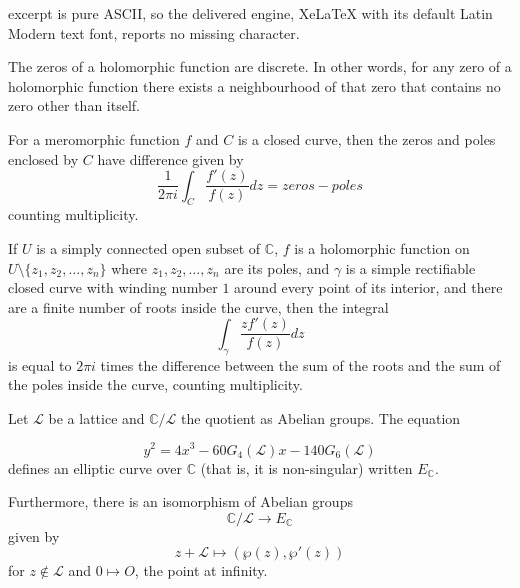 \documentclass[10pt,a4paper]{amsart}
\newcommand{\C}{\mathbb{C}}
\begin{document}
excerpt is pure ASCII, so the delivered engine, XeLaTeX with its default Latin Modern text font, reports no missing character.
\begin{thm}\label{discretezero}
    The zeros of a holomorphic function are discrete. In other words, for any zero of a holomorphic function there exists a neighbourhood of that zero that contains no zero other than itself.
\end{thm}

\begin{thm}\label{argprinciple}For a meromorphic function $f$ and $C$ is a closed curve, then the zeros and poles enclosed by $C$ have difference given by
$$\frac{1}{2\pi i}\int_C\frac{f'(z)}{f(z)}dz= zeros-poles$$
counting multiplicity.
\end{thm}

\begin{theorem} \label{extended-argument-principle}
    If $U$ is a simply connected open subset of $\mathbb C$, $f$ is a holomorphic function on $U\setminus\{z_1,z_2,\dots,z_n\}$ where $z_1,z_2,\dots,z_n$ are its poles, and $\gamma$ is a simple rectifiable closed curve with winding number $1$ around every point of its interior, and there are a finite number of roots inside the curve, then the integral
    $$\int_\gamma \frac{zf'(z)}{f(z)}dz$$
    is equal to $2\pi i$ times the difference between the sum of the roots and the sum of the poles inside the curve, counting multiplicity.
\end{theorem}

\begin{thm} Let $\mathcal{L}$ be a lattice and $\C/\mathcal{L}$ the quotient as Abelian groups.
The equation

$$y^2=4x^3-60G_4(\mathcal{L})x-140G_6(\mathcal{L})$$
defines an elliptic curve over $\C$ (that is, it is non-singular) written $E_\C$.

Furthermore, there is an isomorphism of Abelian groups
$$\C/\mathcal{L}\to E_{\C}$$
given by
$$z+\mathcal{L}\mapsto (\wp(z),\wp'(z))$$
for $z\notin \mathcal{L}$ and $0\mapsto O$, the point at infinity.
\end{thm}
\end{document}
